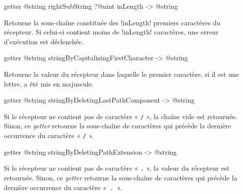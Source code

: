 \begin{galgasbox}
getter @string rightSubString ?@uint inLength -> @string
\end{galgasbox}

Retourne la sous-chaîne constituée des \ggs!inLength! premiers caractères du récepteur. Si celui-ci contient moins de \ggs!inLength! caractères, une erreur d'exécution est déclenchée.









\begin{galgasbox}
getter @string stringByCapitalizingFirstCharacter -> @string
\end{galgasbox}

Retourne la valeur du récepteur dans laquelle le premier caractère, si il est une lettre, a été mis en majuscule.









\begin{galgasbox}
getter @string stringByDeletingLastPathComponent -> @string
\end{galgasbox}

Si le récepteur ne contient pas de caractère « \texttt{/} », la chaîne vide est retournée. Sinon, ce \emph{getter} retourne la sous-chaîne de caractères qui précède la dernière occurrence du caractère « \texttt{/} ».










\begin{galgasbox}
getter @string stringByDeletingPathExtension -> @string
\end{galgasbox}

Si le récepteur ne contient pas de caractère « \texttt{.} », la valeur du récepteur est retournée. Sinon, ce \emph{getter} retourne la sous-chaîne de caractères qui précède la dernière occurrence du caractère «~\texttt{.}~».








